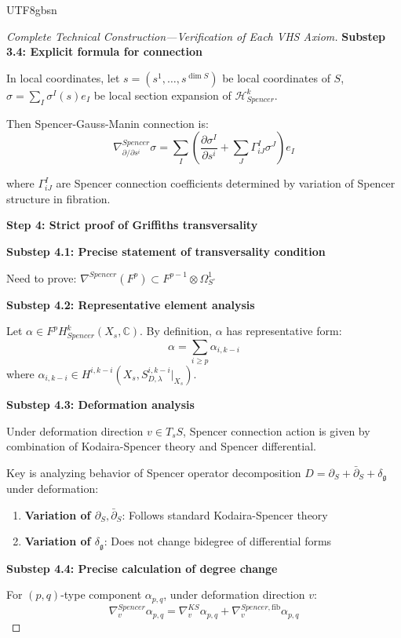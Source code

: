 \documentclass[a4paper,12pt]{extarticle}
\theoremstyle{definition}
\begin{document}
\begin{CJK}{UTF8}{gbsn}
\begin{proof}[Complete Technical Construction—Verification of Each VHS Axiom]
\textbf{Substep 3.4: Explicit formula for connection}

In local coordinates, let $s = (s^1, \ldots, s^{\dim S})$ be local coordinates of $S$, $\sigma = \sum_I \sigma^I(s) e_I$ be local section expansion of $\mathcal{H}^k_{Spencer}$.

Then Spencer-Gauss-Manin connection is:
$$\nabla^{Spencer}_{\partial/\partial s^i} \sigma = \sum_I \left(\frac{\partial \sigma^I}{\partial s^i} + \sum_J \Gamma^I_{iJ} \sigma^J\right) e_I$$

where $\Gamma^I_{iJ}$ are Spencer connection coefficients determined by variation of Spencer structure in fibration.

\textbf{Step 4: Strict proof of Griffiths transversality}

\textbf{Substep 4.1: Precise statement of transversality condition}

Need to prove: $\nabla^{Spencer}(F^p) \subset F^{p-1} \otimes \Omega^1_{S^\circ}$

\textbf{Substep 4.2: Representative element analysis}

Let $\alpha \in F^p H^k_{Spencer}(X_s, \mathbb{C})$. By definition, $\alpha$ has representative form:
$$\alpha = \sum_{i \geq p} \alpha_{i,k-i}$$
where $\alpha_{i,k-i} \in H^{i,k-i}(X_s, S^{i,k-i}_{D,\lambda}|_{X_s})$.

\textbf{Substep 4.3: Deformation analysis}

Under deformation direction $v \in T_sS$, Spencer connection action is given by combination of Kodaira-Spencer theory and Spencer differential.

Key is analyzing behavior of Spencer operator decomposition $D = \partial_S + \bar{\partial}_S + \delta_{\mathfrak{g}}$ under deformation:

\begin{enumerate}
    \item \textbf{Variation of $\partial_S, \bar{\partial}_S$}: Follows standard Kodaira-Spencer theory
    \item \textbf{Variation of $\delta_{\mathfrak{g}}$}: Does not change bidegree of differential forms
\end{enumerate}

\textbf{Substep 4.4: Precise calculation of degree change}

For $(p,q)$-type component $\alpha_{p,q}$, under deformation direction $v$:
$$\nabla^{Spencer}_v \alpha_{p,q} = \nabla^{KS}_v \alpha_{p,q} + \nabla^{Spencer,\text{fib}}_v \alpha_{p,q}$$


\end{proof}
\end{CJK}
\end{document}
